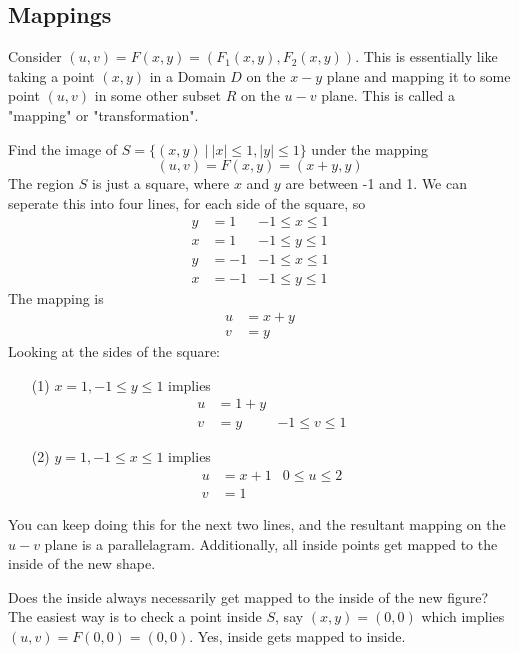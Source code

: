 \documentclass[english, 11pt]{article}
\begin{document}
\subsection{Mappings}

\begin{defn}[mapping]\label{mapping}
Consider $(u,v) = F(x,y) = (F_1(x,y), F_2(x,y))$. This is essentially like taking a point $(x,y)$ in a Domain $D$ on the $x-y$ plane and mapping it to some point $(u,v)$ in some other subset $R$ on the $u-v$ plane. This is called a "mapping" or "transformation".
\end{defn}

\begin{exmp}
  Find the image of $S = \{(x,y) \ | \ |x| \leq 1, |y| \leq 1 \}$ under the mapping
  \[ (u,v) = F(x,y) = (x+y, y) \]
  The region $S$ is just a square, where $x$ and $y$ are between -1 and 1. We can seperate this into four lines, for each side of the square, so
  \begin{align*}
   y & = 1 & -1 \leq x \leq 1 \\
   x & = 1 & -1 \leq y \leq 1 \\
   y & = -1 & -1 \leq x \leq 1 \\
   x & = -1 & -1 \leq y \leq 1
  \end{align*}
  The mapping is
  \begin{align*}
    u & = x + y \\
    v & = y
  \end{align*}
  Looking at the sides of the square:
  \begin{itemize}
    \item[(1)] $x = 1, -1 \leq y \leq 1$ implies
    \begin{align*}
      u & = 1 + y \\
      v & = y & -1 \leq v \leq 1
    \end{align*}
    \item[(2)] $y = 1, -1 \leq x \leq 1$ implies
    \begin{align*}
      u & = x + 1 & 0 \leq u \leq 2 \\
      v & = 1
    \end{align*}
  \end{itemize}
  You can keep doing this for the next two lines, and the resultant mapping on the $u-v$ plane is a parallelagram. Additionally, all inside points get mapped to the inside of the new shape.
\end{exmp}

Does the inside always necessarily get mapped to the inside of the new figure? The easiest way is to check a point inside $S$, say $(x,y) = (0,0)$ which implies $(u,v) = F(0,0) = (0,0)$. Yes, inside gets mapped to inside.
\end{document}

